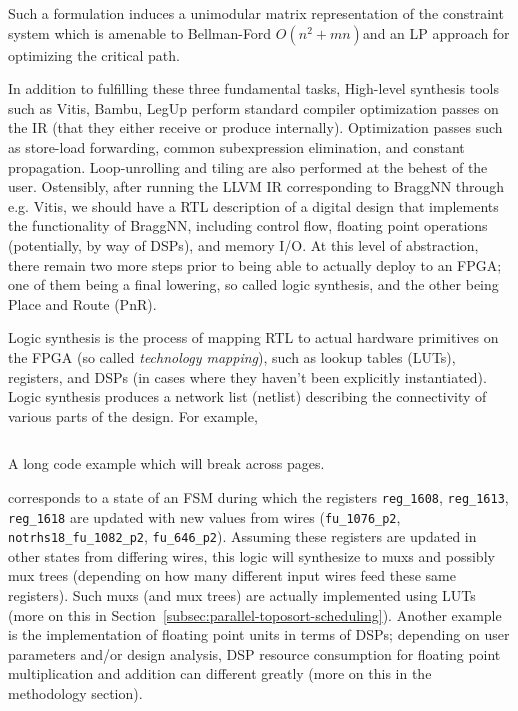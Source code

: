 Such a formulation induces a unimodular matrix representation of the constraint system which is amenable to Bellman-Ford $O(n^2 + mn)$and an LP approach for optimizing the critical path\cite{1688836}.

In addition to fulfilling these three fundamental tasks, High-level synthesis tools such as Vitis, Bambu\cite{ferrandi2021bambu}, LegUp\cite{10.1145/2514740} perform standard compiler optimization passes on the IR (that they either receive or produce internally).
Optimization passes such as store-load forwarding, common subexpression elimination, and constant propagation.
Loop-unrolling and tiling are also performed at the behest of the user.
Ostensibly, after running the LLVM IR corresponding to BraggNN through e.g. Vitis, we should have a RTL description of a digital design that implements the functionality of BraggNN, including control flow, floating point operations (potentially, by way of DSPs), and memory I/O.
At this level of abstraction, there remain two more steps prior to being able to actually deploy to an FPGA; one of them being a final lowering, so called logic synthesis, and the other being Place and Route (PnR).

Logic synthesis is the process of mapping RTL to actual hardware primitives on the FPGA (so called \emph{technology mapping}), such as lookup tables (LUTs), registers, and DSPs (in cases where they haven't been explicitly instantiated).
Logic synthesis produces a network list (netlist) describing the connectivity of various parts of the design.
For example,
\begin{longlisting}
	\inputminted{verilog}{sources/always.v}
	\caption[Long Code Example]{A long code example which will break across pages.}
	\label{lst:long}
\end{longlisting}
\noindent corresponds to a state of an FSM during which the registers \texttt{reg_1608}, \texttt{reg_1613}, \texttt{reg_1618} are updated with new values from wires (\texttt{fu_1076_p2}, \texttt{notrhs18_fu_1082_p2}, \texttt{fu_646_p2}).
Assuming these registers are updated in other states from differing wires, this logic will synthesize to muxs and possibly mux trees (depending on how many different input wires feed these same registers).
Such muxs (and mux trees) are actually implemented using LUTs (more on this in Section~\ref{subsec:parallel-toposort-scheduling}).
Another example is the implementation of floating point units in terms of DSPs; depending on user parameters and/or design analysis, DSP resource consumption for floating point multiplication and addition can different greatly (more on this in the methodology section).

